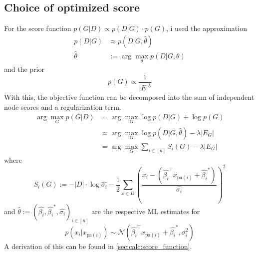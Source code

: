 \documentclass[sigconf, fleqn]{acmart}
\newcommand{\abs}[1]{\left\vert #1 \right\vert}
\def\T{\top}
\def\pa{\text{pa}}
\begin{document}
\subsection{Choice of optimized score}
For the score function $p(G | D) \propto p(D | G) \cdot p(G)$, i used the approximation
\begin{align*}
	p(D | G)     & \approx p(D | G, \hat{\theta})               \\
	\hat{\theta} & := \arg\max\limits_{\theta} p(D | G, \theta)
\end{align*}
and the prior
$$p(G) \propto \frac{1}{|E|^\lambda}$$
With this, the objective function can be decomposed into the sum of independent node scores and a regularization term.
\begin{align*}
	\arg\max\limits_G p(G | D) & = \arg\max\limits_G \log p(D | G) + \log p(G)                             \\
	                           & \approx \arg\max\limits_G \log p(D | G, \hat{\theta}) - \lambda \abs{E_G} \\
	                           & = \arg\max\limits_G \sum\limits_{i \in [n]} S_i(G) - \lambda \abs{E_G}
\end{align*}
where
$$S_i(G) := -\abs{D} \cdot \log \hat{\sigma_i} - \frac{1}{2} \sum\limits_{x \in D} \left(\frac{x_i - (\hat{\beta_i}^\T x_{\pa(i)} + \hat{\beta_i}^*)}{\hat{\sigma_i}}\right)^2$$
and $\hat{\theta} := \left(\hat{\beta_i}, \hat{\beta_i}^*, \hat{\sigma_i}\right)_{i \in [n]}$ are the respective ML estimates for
$$p(x_i | x_{\pa(i)}) \sim \mathcal{N}(\hat{\beta_i}^\T x_{\pa(i)} + \hat{\beta_i}^*, \sigma_i^2)$$
A derivation of this can be found in \autoref{sec:calc:score_function}.
\end{document}
